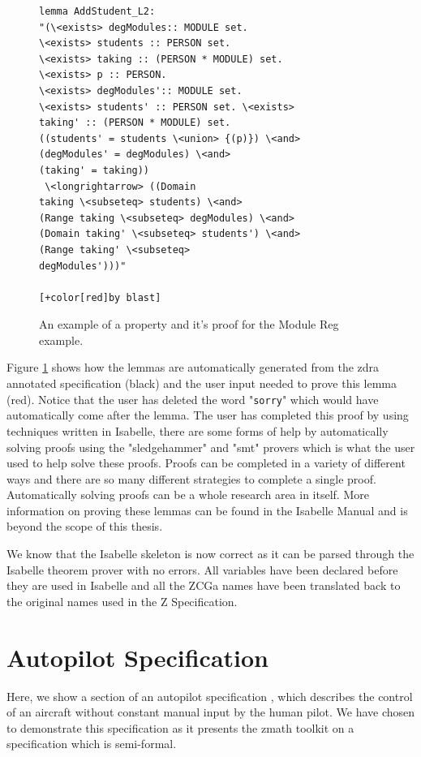 \begin{figure}[H]
\begin{minipage}{0.45\textwidth}
\begin{scriptsize}
\begin{BVerbatim}[commandchars=+\[\]]
lemma AddStudent_L2: 
"(\<exists> degModules:: MODULE set. 
\<exists> students :: PERSON set. 
\<exists> taking :: (PERSON * MODULE) set. 
\<exists> p :: PERSON.
\<exists> degModules':: MODULE set. 
\<exists> students' :: PERSON set. \<exists>
taking' :: (PERSON * MODULE) set. 
((students' = students \<union> {(p)}) \<and>
(degModules' = degModules) \<and> 
(taking' = taking))
 \<longrightarrow> ((Domain
taking \<subseteq> students) \<and> 
(Range taking \<subseteq> degModules) \<and>
(Domain taking' \<subseteq> students') \<and> 
(Range taking' \<subseteq>
degModules')))"

[+color[red]by blast]
\end{BVerbatim}
\end{scriptsize}
\end{minipage}
\caption{An example of a property and it's proof for the Module Reg example. \label{fig:propertyproof}}
\end{figure}

Figure \ref{fig:propertyproof} shows how the lemmas are automatically generated from
the \gls{zdra} annotated specification (black) and the user input needed to
prove this lemma (red). Notice that the user has deleted the word
"\texttt{sorry}" which would have automatically come after the lemma.
The user has completed this proof by using techniques written in Isabelle, there are some forms of 
help by automatically solving proofs using the "sledgehammer" and "smt" provers which is what the 
user used to help solve these proofs.
Proofs can be completed in a variety of different ways and there are so many different strategies 
to complete a single proof. Automatically solving proofs can be a whole research area in itself.
More information on proving these lemmas can be found in the Isabelle Manual
\cite{isabelle} and is beyond the scope of this thesis.

We know that the Isabelle skeleton is now correct as it can be parsed through the 
Isabelle theorem prover with no errors.
All variables have been declared before they are used in Isabelle and all the ZCGa names
have been translated back to the original names used in the Z Specification.

\section{Autopilot Specification}
Here, we show a section of an autopilot specification \cite{Butler96}, which describes
the control of an aircraft without constant manual input by the human pilot.
We have chosen to demonstrate this specification as it presents the \gls{zmath}
toolkit on a specification which is semi-formal.

